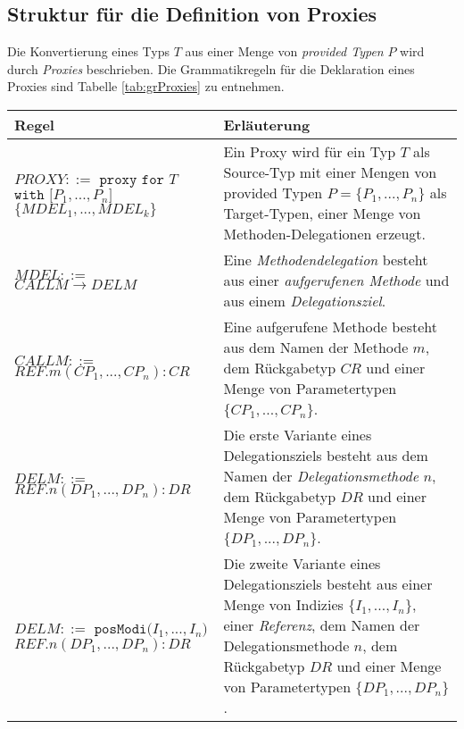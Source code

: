 \subsection{Struktur für die Definition von Proxies}\label{sec:proxygram}
Die Konvertierung eines Typs $T$ aus einer Menge von \emph{provided Typen} $P$ wird durch \emph{Proxies} beschrieben. Die Grammatikregeln für die Deklaration eines Proxies sind Tabelle \ref{tab:grProxies} zu entnehmen.
\begin{table}[H]
\centering
\begin{tabular}{|p{5cm}|p{9cm}|}
\hline
\hline
\centering\textbf{Regel} & \textbf{Erläuterung} \\
\hline
\hline
$\mathit{PROXY} ::=$\newline
$\texttt{proxy } \texttt{for } T$\newline
$ \texttt{with [}\mathit{P_1},...,\mathit{P_n}\texttt{]}$ \newline
$\texttt{\{}\mathit{MDEL_1},...,\mathit{MDEL_k} \texttt{\}}$
 & Ein Proxy wird für ein Typ $T$ als Source-Typ mit einer Mengen von provided Typen $P = \{P_1,...,P_n\}$ als Target-Typen, einer Menge von Methoden-Delegationen erzeugt.\\
\hline
$\mathit{MDEL} ::=$\newline
$CALLM \rightarrow DELM $  & Eine \emph{Methodendelegation} besteht aus einer \emph{aufgerufenen Methode} und aus einem \emph{Delegationsziel}.\\
\hline
$\mathit{CALLM} ::=$\newline 
$\mathit{REF}.\mathit{m(\mathit{CP_1},...,\mathit{CP_n}):CR} $  & Eine aufgerufene Methode besteht aus dem Namen der Methode $m$, dem Rückgabetyp $\mathit{CR}$ und einer Menge von Parametertypen $\{\mathit{CP_1},...,\mathit{CP_n}\}$.\\
\hline
$\mathit{DELM} ::=$\newline 
$\mathit{REF}.\mathit{n(\mathit{DP_1},...,\mathit{DP_n}):DR} $  
& Die erste Variante eines Delegationsziels besteht aus  dem Namen der \emph{Delegationsmethode} $n$, dem Rückgabetyp $\mathit{DR}$ und einer Menge von Parametertypen $\{\mathit{DP_1},...,\mathit{DP_n}\}$.\\
\hline
$\mathit{DELM} ::=$\newline
$\texttt{posModi(} \mathit{I_1},...,\mathit{I_n} \texttt{)}$\newline
$\mathit{REF}.\mathit{n(\mathit{DP_1},...,\mathit{DP_n}):DR} $  
& Die zweite Variante eines Delegationsziels besteht aus einer Menge von Indizies $\{\mathit{I_1},...,\mathit{I_n}\}$, einer \emph{Referenz}, dem Namen der Delegationsmethode $n$, dem Rückgabetyp $\mathit{DR}$ und einer Menge von Parametertypen $\{\mathit{DP_1},...,\mathit{DP_n}\}$.\\

\end{tabular}
\end{table}
